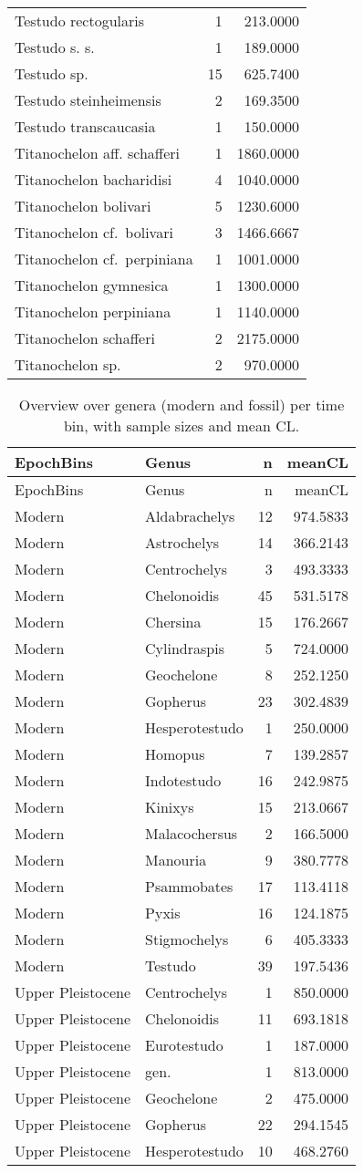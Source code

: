 \begin{longtable}[]{@{}lrr@{}}
	Testudo rectogularis & 1 & 213.0000\tabularnewline
	Testudo s. s. & 1 & 189.0000\tabularnewline
	Testudo sp. & 15 & 625.7400\tabularnewline
	Testudo steinheimensis & 2 & 169.3500\tabularnewline
	Testudo transcaucasia & 1 & 150.0000\tabularnewline
	Titanochelon aff. schafferi & 1 & 1860.0000\tabularnewline
	Titanochelon bacharidisi & 4 & 1040.0000\tabularnewline
	Titanochelon bolivari & 5 & 1230.6000\tabularnewline
	Titanochelon cf.~bolivari & 3 & 1466.6667\tabularnewline
	Titanochelon cf.~perpiniana & 1 & 1001.0000\tabularnewline
	Titanochelon gymnesica & 1 & 1300.0000\tabularnewline
	Titanochelon perpiniana & 1 & 1140.0000\tabularnewline
	Titanochelon schafferi & 2 & 2175.0000\tabularnewline
	Titanochelon sp. & 2 & 970.0000\tabularnewline
	\bottomrule
\end{longtable}

\begin{longtable}[]{@{}llrr@{}}
	\caption[Genera per time bins]{Overview over genera (modern and fossil) per time bin, with
		sample sizes and mean CL.}
	\label{tab:GenBins}\tabularnewline
	\toprule
	EpochBins & Genus & n & meanCL\tabularnewline
	\midrule
	\endfirsthead
	\toprule
	EpochBins & Genus & n & meanCL\tabularnewline
	\midrule
	\endhead
	Modern & Aldabrachelys & 12 & 974.5833\tabularnewline
	Modern & Astrochelys & 14 & 366.2143\tabularnewline
	Modern & Centrochelys & 3 & 493.3333\tabularnewline
	Modern & Chelonoidis & 45 & 531.5178\tabularnewline
	Modern & Chersina & 15 & 176.2667\tabularnewline
	Modern & Cylindraspis & 5 & 724.0000\tabularnewline
	Modern & Geochelone & 8 & 252.1250\tabularnewline
	Modern & Gopherus & 23 & 302.4839\tabularnewline
	Modern & Hesperotestudo & 1 & 250.0000\tabularnewline
	Modern & Homopus & 7 & 139.2857\tabularnewline
	Modern & Indotestudo & 16 & 242.9875\tabularnewline
	Modern & Kinixys & 15 & 213.0667\tabularnewline
	Modern & Malacochersus & 2 & 166.5000\tabularnewline
	Modern & Manouria & 9 & 380.7778\tabularnewline
	Modern & Psammobates & 17 & 113.4118\tabularnewline
	Modern & Pyxis & 16 & 124.1875\tabularnewline
	Modern & Stigmochelys & 6 & 405.3333\tabularnewline
	Modern & Testudo & 39 & 197.5436\tabularnewline
	Upper Pleistocene & Centrochelys & 1 & 850.0000\tabularnewline
	Upper Pleistocene & Chelonoidis & 11 & 693.1818\tabularnewline
	Upper Pleistocene & Eurotestudo & 1 & 187.0000\tabularnewline
	Upper Pleistocene & gen. & 1 & 813.0000\tabularnewline
	Upper Pleistocene & Geochelone & 2 & 475.0000\tabularnewline
	Upper Pleistocene & Gopherus & 22 & 294.1545\tabularnewline
	Upper Pleistocene & Hesperotestudo & 10 & 468.2760\tabularnewline

\end{longtable}
